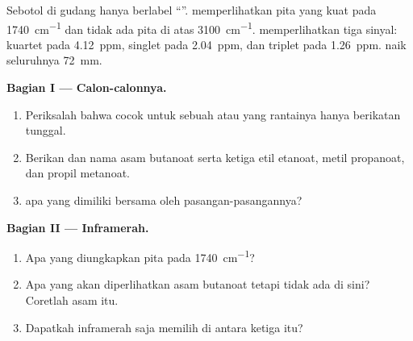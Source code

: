 \begin{problem}
\label{pb:g12:proton-nmr:1}
Sebotol  di gudang hanya berlabel ``''.  memperlihatkan pita yang kuat pada \qty{1740}{cm^{-1}} dan
tidak ada pita di atas \qty{3100}{cm^{-1}}. 
memperlihatkan tiga sinyal: kuartet pada \qty{4.12}{ppm}, singlet pada
\qty{2.04}{ppm}, dan triplet pada \qty{1.26}{ppm}. 
naik seluruhnya \qty{72}{mm}.

\medskip
\noindent\textbf{Bagian I --- Calon-calonnya.}
\begin{enumerate}
  \item Periksalah bahwa  cocok untuk sebuah  atau  yang rantainya hanya berikatan tunggal.
  \item Berikan  dan nama asam butanoat serta
        ketiga  etil etanoat, metil propanoat, dan propil
        metanoat.
  \item {} apa yang dimiliki bersama oleh pasangan-pasangannya?
\end{enumerate}

\medskip
\noindent\textbf{Bagian II --- Inframerah.}
\begin{enumerate}[resume]
  \item Apa yang diungkapkan pita pada \qty{1740}{cm^{-1}}?
  \item Apa yang akan diperlihatkan asam butanoat tetapi tidak ada di
        sini? Coretlah asam itu.
  \item Dapatkah inframerah saja memilih di antara ketiga  itu?
\end{enumerate}


\end{problem}
